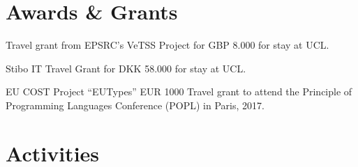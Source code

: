 \documentclass[10pt,letterpaper]{article}
\renewenvironment{itemize}{
  \begin{list}{}{
    \setlength{\leftmargin}{1.5em}
    \setlength{\itemsep}{0.25em}
    \setlength{\parskip}{0pt}
    \setlength{\parsep}{0.25em}
  }
}{
  \end{list}
}
\begin{document}
\section*{Awards \& Grants}

\begin{itemize}
  \item Travel grant from EPSRC's VeTSS Project for GBP 8.000 for stay at UCL.
  \item Stibo IT Travel Grant for DKK 58.000 for stay at UCL.
  \item EU COST Project ``EUTypes'' EUR 1000 Travel grant to attend the Principle of
  Programming Languages Conference (POPL) in Paris, 2017.
\end{itemize}

\section*{Activities}
\end{document}
